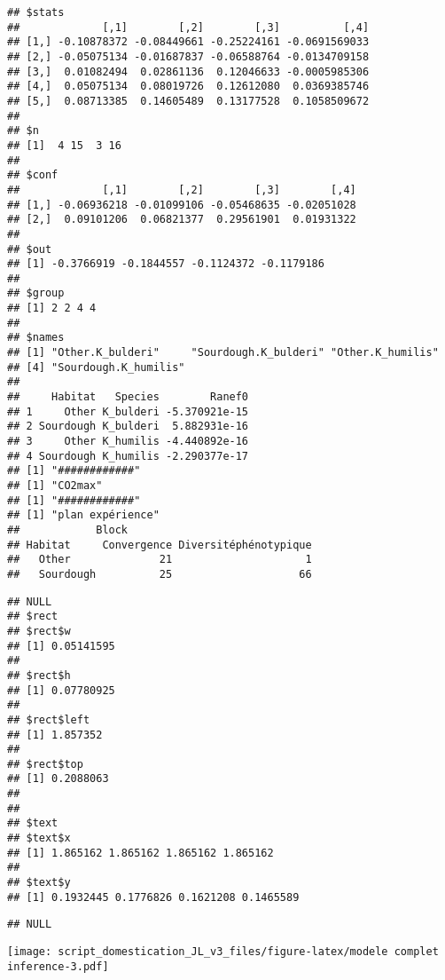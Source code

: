 \documentclass[
]{article}
\begin{document}
\begin{verbatim}
## $stats
##             [,1]        [,2]        [,3]          [,4]
## [1,] -0.10878372 -0.08449661 -0.25224161 -0.0691569033
## [2,] -0.05075134 -0.01687837 -0.06588764 -0.0134709158
## [3,]  0.01082494  0.02861136  0.12046633 -0.0005985306
## [4,]  0.05075134  0.08019726  0.12612080  0.0369385746
## [5,]  0.08713385  0.14605489  0.13177528  0.1058509672
## 
## $n
## [1]  4 15  3 16
## 
## $conf
##             [,1]        [,2]        [,3]        [,4]
## [1,] -0.06936218 -0.01099106 -0.05468635 -0.02051028
## [2,]  0.09101206  0.06821377  0.29561901  0.01931322
## 
## $out
## [1] -0.3766919 -0.1844557 -0.1124372 -0.1179186
## 
## $group
## [1] 2 2 4 4
## 
## $names
## [1] "Other.K_bulderi"     "Sourdough.K_bulderi" "Other.K_humilis"    
## [4] "Sourdough.K_humilis"
## 
##     Habitat   Species        Ranef0
## 1     Other K_bulderi -5.370921e-15
## 2 Sourdough K_bulderi  5.882931e-16
## 3     Other K_humilis -4.440892e-16
## 4 Sourdough K_humilis -2.290377e-17
## [1] "############"
## [1] "CO2max"
## [1] "############"
## [1] "plan expérience"
##            Block
## Habitat     Convergence Diversitéphénotypique
##   Other              21                     1
##   Sourdough          25                    66
\end{verbatim}

\begin{verbatim}
## NULL
## $rect
## $rect$w
## [1] 0.05141595
## 
## $rect$h
## [1] 0.07780925
## 
## $rect$left
## [1] 1.857352
## 
## $rect$top
## [1] 0.2088063
## 
## 
## $text
## $text$x
## [1] 1.865162 1.865162 1.865162 1.865162
## 
## $text$y
## [1] 0.1932445 0.1776826 0.1621208 0.1465589
\end{verbatim}

\begin{verbatim}
## NULL
\end{verbatim}

\texttt{[image: script\_domestication\_JL\_v3\_files/figure-latex/modele complet inference-3.pdf]}
\end{document}
